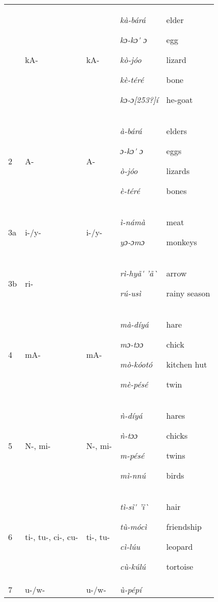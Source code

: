 \documentclass[output=paper]{langsci/langscibook}
\begin{document}
\begin{tabularx}{\textwidth}{XXXXX}
\lsptoprule
1 & kA- & kA- & \textit{kà-bárá}

\textit{kɔ-kɔ\'{} ɔ}

\textit{kò-jóo}

\textit{kè-téré}

\textit{kɔ-ɔ[253?]í} & elder

egg

lizard

bone

he-goat\\
2 & A- & A- & \textit{à-bárá}

\textit{ɔ-kɔ\'{} ɔ}

\textit{ò-jóo}

\textit{è-téré} & elders

eggs

lizards

bones\\
3a & i-/y- & i-/y- & \textit{ì-námà}

\textit{yɔ-ɔmɔ} & meat

monkeys\\
3b & ri- &  & \textit{rì-hyã\'{} 'ã\`{} }

\textit{rú-usì} & arrow

rainy season\\
4 & mA- & mA- & \textit{mà-díyá}

\textit{mɔ-tɔɔ}

\textit{mò-kóotó}

\textit{mè-pésé} & hare

chick

kitchen hut

twin\\
5 & N-, mi- & N-, mi- & \textit{ǹ-díyá}

\textit{ǹ-tɔɔ}

\textit{m-pésé}

\textit{mì-nnú} & hares

chicks

twins

birds\\
6 & ti-, tu-, ci-, cu- & ti-, tu- & \textit{tì-sĩ\'{} 'ĩ\`{} }

\textit{tù-mócì}

\textit{cì-lúu}

\textit{cù-kúlú} & hair

friendship

leopard

tortoise\\
7 & u-/w- & u-/w- & \textit{ù-pépí}


\end{tabularx}
\end{document}
